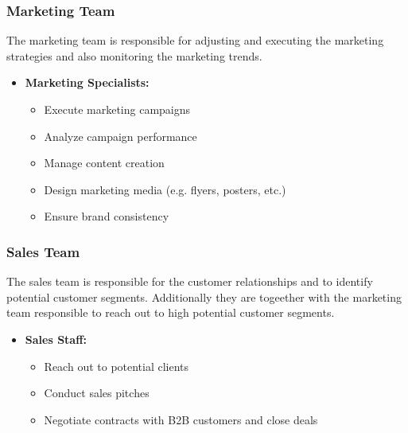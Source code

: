 \subsubsection*{Marketing Team}
The marketing team is responsible for adjusting and executing the marketing strategies and also monitoring the marketing trends.
\begin{itemize}
    \item \textbf{Marketing Specialists:}
            \begin{itemize}
                \item Execute marketing campaigns
                \item Analyze campaign performance
                \item Manage content creation
                \item Design marketing media (e.g. flyers, posters, etc.)
                \item Ensure brand consistency
            \end{itemize}
\end{itemize}

\subsubsection*{Sales Team}
The sales team is responsible for the customer relationships and to identify potential customer segments.
Additionally they are togeether with the marketing team responsible to reach out to high potential customer segments.
\begin{itemize}
    \item \textbf{Sales Staff:}
            \begin{itemize}
                \item Reach out to potential clients
                \item Conduct sales pitches
                \item Negotiate contracts with B2B customers and close deals
            \end{itemize}
\end{itemize}

